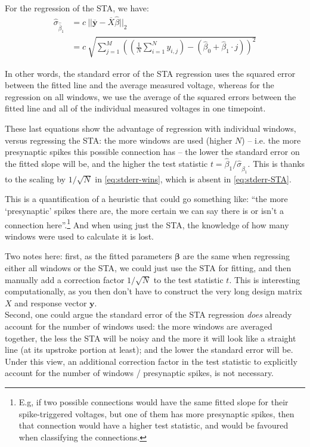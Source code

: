 For the regression of the STA, we have:
\begin{align}
    \hat{σ}_{\hat{\overline{β}}_1}
    &= c\ || \overline{\bm{y}} - \overline{X} \hat{β} || _2 \\
    &=  c\ \sqrt{\sum_{j=1}^M \left(
        \left(\frac{1}{N}\sum_{i=1}^N y_{i,j}\right)
        - (\hat{β}_0 + \hat{β}_1 · j)  \right)^2 }   \label{eq:stderr-STA}
\end{align}

In other words, the standard error of the STA regression uses the squared error between the fitted line and the average measured voltage, whereas for the regression on all windows, we use the average of the squared errors between the fitted line and all of the individual measured voltages in one timepoint.

These last equations show the advantage of regression with individual windows, versus regressing the STA: the more windows are used (higher $N$) -- i.e. the more presynaptic spikes this possible connection has -- the lower the standard error on the fitted slope will be, and the higher the test statistic $t = \hat{β}_1 / \hat{σ}_{\hat{β}_1}$. This is thanks to the scaling by $1 / \sqrt{N}$ in \cref{eq:stderr-wins}, which is absent in \cref{eq:stderr-STA}.

This is a quantification of a heuristic that could go something like: ``the more `presynaptic' spikes there are, the more certain we can say there is or isn't a connection here''.\footnote{
    E.g, if two possible connections would have the same fitted slope for their spike-triggered voltages, but one of them has more presynaptic spikes, then that connection would have a higher test statistic, and would be favoured when classifying the connections.
} And when using just the STA, the knowledge of how many windows were used to calculate it is lost.

Two notes here: first, as the fitted parameters $\bm{β}$ are the same when regressing either all windows or the STA, we could just use the STA for fitting, and then manually add a correction factor $1 / \sqrt{N}$ to the test statistic $t$. This is interesting computationally, as you then don't have to construct the very long design matrix $X$ and response vector $\bm{y}$.\\
Second, one could argue the standard error of the STA regression \emph{does} already account for the number of windows used: the more windows are averaged together, the less the STA will be noisy and the more it will look like a straight line (at its upstroke portion at least); and the lower the standard error will be. Under this view, an additional correction factor in the test statistic to explicitly account for the number of windows / presynaptic spikes, is not necessary.




